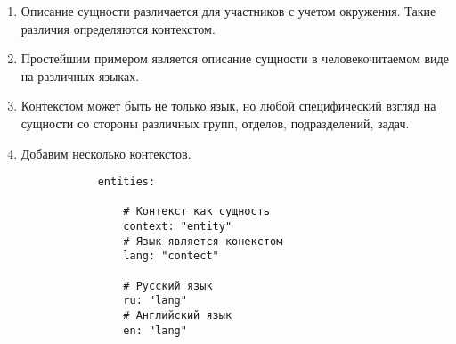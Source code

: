 \documentclass[final]{article}
\begin{document}
        \begin{enumerate} 

            \item Описание сущности различается для участников с 
            учетом окружения. Такие различия определяются контекстом.

            \item Простейшим примером является описание сущности в 
            человекочитаемом виде на различных языках.

            \item Контекстом может быть не только язык, но любой специфический 
            взгляд на сущности со стороны различных групп, отделов, 
            подразделений, задач.

            \item Добавим несколько контекстов.

            \begin{verbatim}
            entities:

                # Контекст как сущность
                context: "entity"
                # Язык является конекстом
                lang: "contect"

                # Русский язык
                ru: "lang"
                # Английский язык
                en: "lang"

            \end{verbatim}

        \end{enumerate}
\end{document}
